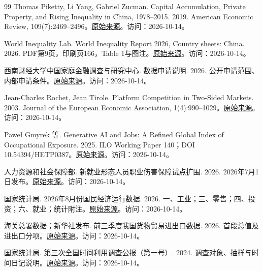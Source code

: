 \documentclass[UTF8,fontset=fandol,zihao=-4,oneside,openany]{ctexbook}
\begin{document}
\begin{thebibliography}{99}
 Thomas Piketty, Li Yang, Gabriel Zucman. Capital Accumulation, Private Property, and Rising Inequality in China, 1978–2015. 2019. American Economic Review, 109(7):2469–2496。\href{\detokenize{https://www.aeaweb.org/articles?id=10.1257/aer.20170973}}{原始来源}。访问：2026-10-14。

 World Inequality Lab. World Inequality Report 2026, Country sheets: China. 2026. PDF第9页，印刷页166，Table 1与图注。\href{\detokenize{https://wir2026.wid.world/www-site/uploads/2026/09/WIR26_Country_Sheets.pdf}}{原始来源}。访问：2026-10-14。

 西南财经大学中国家庭金融调查与研究中心. 数据申请说明. 2026. 公开申请范围、内部申请条件。\href{\detokenize{https://chfs.swufe.edu.cn/sjzx/sjsq.htm}}{原始来源}。访问：2026-10-14。

 Jean-Charles Rochet, Jean Tirole. Platform Competition in Two-Sided Markets. 2003. Journal of the European Economic Association, 1(4):990–1029。\href{\detokenize{https://academic.oup.com/jeea/article-abstract/1/4/990/2280902}}{原始来源}。访问：2026-10-14。

 Paweł Gmyrek 等. Generative AI and Jobs: A Refined Global Index of Occupational Exposure. 2025. ILO Working Paper 140；DOI 10.54394/HETP0387。\href{\detokenize{https://researchrepository.ilo.org/esploro/outputs/encyclopediaEntry/Generative-AI-and-jobs-a-refined/995653520102676}}{原始来源}。访问：2026-10-14。

 人力资源和社会保障部. 新就业形态人员职业伤害保障试点扩围. 2026. 2026年7月1日发布。\href{\detokenize{https://www.mohrss.gov.cn/wap/xw/rsxw/202607/t20260701_579347.html}}{原始来源}。访问：2026-10-14。

 国家统计局. 2026年8月份国民经济运行数据. 2026. 一、工业；三、零售；四、投资；六、就业；统计附注。\href{\detokenize{https://www.stats.gov.cn/sj/zxfbhjd/202609/t20260915_1965307.html}}{原始来源}。访问：2026-10-14。

 海关总署数据；新华社发布. 前三季度我国货物贸易进出口数据. 2026. 首段总值及进出口分项。\href{\detokenize{https://www.xinhuanet.com/20261014/60d6cef6c94e4afb9234dddf3bbea5c0/c.html}}{原始来源}。访问：2026-10-14。

 国家统计局. 第三次全国时间利用调查公报（第一号）. 2024. 调查对象、抽样与时间日记说明。\href{\detokenize{https://www.stats.gov.cn/sj/zxfb/202410/t20241031_1957217.html}}{原始来源}。访问：2026-10-14。


\end{thebibliography}
\end{document}
